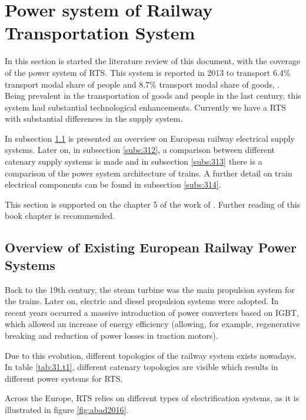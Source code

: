 




\section{Power system of Railway Transportation System}


In this section is started the literature review of this document, with the coverage of the power system of \ac{RTS}. This system is reported in 2013 to transport 6.4\% transport modal share of people and 8.7\% transport modal share of goods, \cite{iea-uic2016}. 
Being prevalent in the transportation of goods and people in the last century, this system had substantial technological enhancements. Currently we have a \ac{RTS} with substantial differences in the supply system.

In subsection \ref{subs:311} is presented an overview on European railway electrical supply systems. Later on, in subsection \ref{subs:312}, a comparison between different catenary supply systems is made and in subsection \ref{subs:313} there is a comparison of the power system architecture of trains. A further detail on train electrical components can be found in subsection \ref{subs:314}.

This section is supported on the chapter 5 of the work of \cite{abad2016}. Further reading of this book chapter is recommended. 

\subsection{Overview of Existing European Railway Power Systems}
\label{subs:311}
Back to the 19th century, the steam turbine was the main propulsion system for the trains. Later on, electric and diesel propulsion systems were adopted. In recent years occurred a massive introduction of power converters based on \ac{IGBT}, which allowed an increase of energy efficiency (allowing, for example, regenerative breaking and reduction of power losses in traction motors).

Due to this evolution, different topologies of the railway system exists nowadays. In table \ref{tab:31.t1}, different catenary topologies are visible which results in different power systems for \ac{RTS}.




Across the Europe, \ac{RTS} relies on different types of electrification systems, as it is illustrated in figure \ref{fig:abad2016}.


